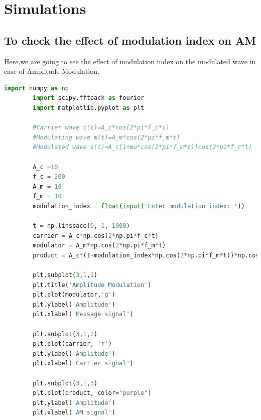 \documentclass[12pt,a4paper]{article}%
\begin{document}
	\section{Simulations}
	\subsection{To check the effect of modulation index on AM}
	\begin{flushleft}Here,we are going to see the effect of modulation index on the modulated wave in case of Amplitude Modulation.
		\lstset{numbers=none,breaklines=true,} 
		\begin{lstlisting}[language=python]
		import numpy as np
		import scipy.fftpack as fourier
		import matplotlib.pyplot as plt
		
		#Carrier wave c(t)=A_c*cos(2*pi*f_c*t)
		#Modulating wave m(t)=A_m*cos(2*pi*f_m*t)
		#Modulated wave s(t)=A_c[1+mu*cos(2*pi*f_m*t)]cos(2*pi*f_c*t)
		
		A_c =10
		f_c = 200
		A_m = 10
		f_m = 10
		modulation_index = float(input('Enter modulation index: '))
		
		t = np.linspace(0, 1, 1000)
		carrier = A_c*np.cos(2*np.pi*f_c*t)
		modulator = A_m*np.cos(2*np.pi*f_m*t)
		product = A_c*(1+modulation_index*np.cos(2*np.pi*f_m*t))*np.cos(2*np.pi*f_c*t)
		
		plt.subplot(3,1,1)
		plt.title('Amplitude Modulation')
		plt.plot(modulator,'g')
		plt.ylabel('Amplitude')
		plt.xlabel('Message signal')
		
		plt.subplot(3,1,2)
		plt.plot(carrier, 'r')
		plt.ylabel('Amplitude')
		plt.xlabel('Carrier signal')
		
		plt.subplot(3,1,3)
		plt.plot(product, color="purple")
		plt.ylabel('Amplitude')
		plt.xlabel('AM signal')
		

\end{lstlisting}
\end{flushleft}
\end{document}
